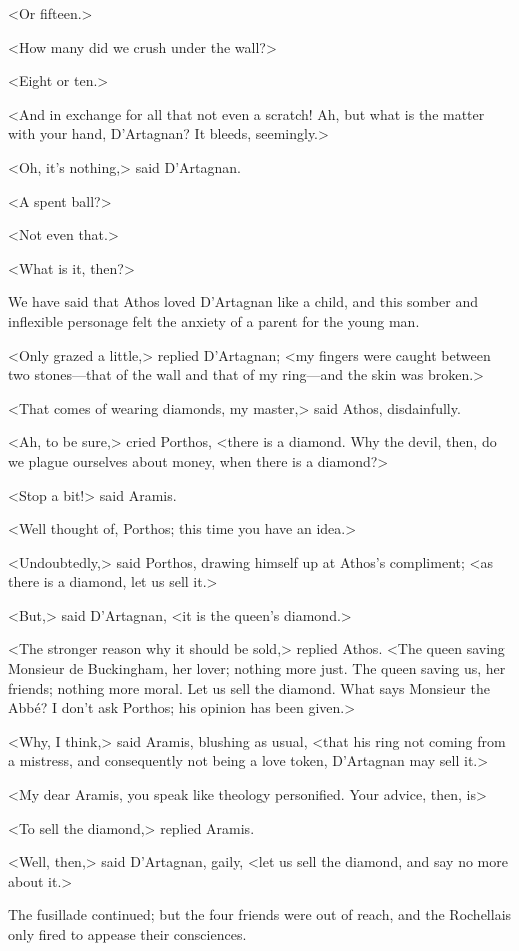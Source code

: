 <Or fifteen.> 

<How many did we crush under the wall?> 

<Eight or ten.> 

<And in exchange for all that not even a scratch! Ah, but what is the matter with your hand, D'Artagnan? It bleeds, seemingly.> 

<Oh, it's nothing,> said D'Artagnan. 

<A spent ball?> 

<Not even that.> 

<What is it, then?> 

We have said that Athos loved D'Artagnan like a child, and this somber and inflexible personage felt the anxiety of a parent for the young man. 

<Only grazed a little,> replied D'Artagnan; <my fingers were caught between two stones—that of the wall and that of my ring—and the skin was broken.> 

<That comes of wearing diamonds, my master,> said Athos, disdainfully. 

<Ah, to be sure,> cried Porthos, <there is a diamond. Why the devil, then, do we plague ourselves about money, when there is a diamond?> 

<Stop a bit!> said Aramis. 

<Well thought of, Porthos; this time you have an idea.> 

<Undoubtedly,> said Porthos, drawing himself up at Athos's compliment; <as there is a diamond, let us sell it.> 

<But,> said D'Artagnan, <it is the queen's diamond.> 

<The stronger reason why it should be sold,> replied Athos. <The queen saving Monsieur de Buckingham, her lover; nothing more just. The queen saving us, her friends; nothing more moral. Let us sell the diamond. What says Monsieur the Abbé? I don't ask Porthos; his opinion has been given.> 

<Why, I think,> said Aramis, blushing as usual, <that his ring not coming from a mistress, and consequently not being a love token, D'Artagnan may sell it.> 

<My dear Aramis, you speak like theology personified. Your advice, then, is\longdash> 

<To sell the diamond,> replied Aramis. 

<Well, then,> said D'Artagnan, gaily, <let us sell the diamond, and say no more about it.> 

The fusillade continued; but the four friends were out of reach, and the Rochellais only fired to appease their consciences. 

